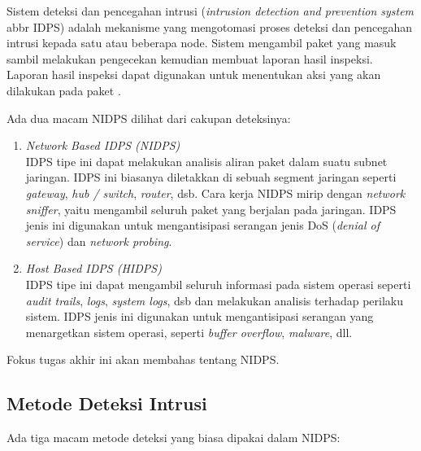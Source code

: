     Sistem deteksi dan pencegahan intrusi (\emph{intrusion detection and prevention system} abbr IDPS) adalah mekanisme yang mengotomasi proses deteksi dan pencegahan intrusi kepada satu atau beberapa node. Sistem mengambil paket yang masuk sambil melakukan pengecekan kemudian membuat laporan hasil inspeksi. Laporan hasil inspeksi dapat digunakan untuk menentukan aksi yang akan dilakukan pada paket \parencite{nist2007}.

    Ada dua macam NIDPS dilihat dari cakupan deteksinya:

    \begin{enumerate}

      \item 
      \emph{Network Based IDPS (NIDPS)} \\
      IDPS tipe ini dapat melakukan analisis aliran paket dalam suatu subnet jaringan. IDPS ini biasanya diletakkan di sebuah segment jaringan seperti \emph{gateway}, \emph{hub / switch}, \emph{router}, dsb. Cara kerja NIDPS mirip dengan \emph{network sniffer}, yaitu mengambil seluruh paket yang berjalan pada jaringan. IDPS jenis ini digunakan untuk mengantisipasi serangan jenis DoS (\emph{denial of service}) dan \emph{network probing}.

       \item 
      \emph{Host Based IDPS (HIDPS)} \\
      IDPS tipe ini dapat mengambil seluruh informasi pada sistem operasi seperti \emph{audit trails}, \emph{logs}, \emph{system logs}, dsb dan melakukan analisis terhadap perilaku sistem. IDPS jenis ini digunakan untuk mengantisipasi serangan yang menargetkan sistem operasi, seperti \emph{buffer overflow}, \emph{malware}, dll.

    \end{enumerate}

    Fokus tugas akhir ini akan membahas tentang NIDPS.

  \subsection{Metode Deteksi Intrusi}

    Ada tiga macam metode deteksi yang biasa dipakai dalam NIDPS:

